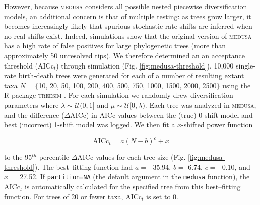 However, because \textsc{medusa} considers all possible nested piecewise diversification models, an additional concern is that of multiple testing: as trees grow larger, it becomes increasingly likely that spurious stochastic rate shifts are inferred when no real shifts exist. Indeed, simulations show that the original version of \textsc{medusa} has a high rate of false positives for large phylogenetic trees (more than approximately 50 unresolved tips). We therefore determined an an acceptance threshold (AICc$_t$) through simulation (Fig. \ref{fig:medusa-threshold}). 10,000 single-rate birth-death trees were generated for each of a number of resulting extant taxa $N = \lbrace$10, 20, 50, 100, 200, 400, 500, 750, 1000, 1500, 2000, 2500$\rbrace$ using the R package \textsc{treesim} \citep{treesim}. For each simulation we randomly drew diversification parameters where $\lambda \sim \mathcal{U}(0,1]$ and $\mu \sim \mathcal{U}[0, \lambda)$. Each tree was analyzed in \textsc{medusa}, and the difference ($\Delta$AICc) in AICc values between the (true) 0-shift model and best (incorrect) 1-shift model was logged. We then fit a $x$-shifted power function

\begin{equation}
\mathrm{AICc}_{t} = a (N - b)^{c} + x 
\end{equation}

to the 95$^{th}$ percentile $\Delta$AICc values for each tree size (Fig. \ref{fig:medusa-threshold}). The best--fitting function had $a =$ -35.94, $b =$ 6.74, $c =$ -0.10, and $x =$ 27.52. If \texttt{partition=NA} (the default argument in the \texttt{medusa} function), the AICc$_{t}$ is automatically calculated for the specified tree from this best--fitting function. For trees of 20 or fewer taxa, AICc$_{t}$ is set to 0.

